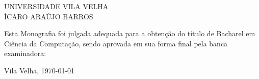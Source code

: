 
%
% 
%
\begin{folhadeaprovacao}


\begin{center}


            {UNIVERSIDADE VILA VELHA} \\
           

    \vspace{1.5cm}
                                    {ÍCARO ARAÚJO BARROS}\\
    \bfseries{}
\end{center}

Esta Monografia foi julgada adequada para a obten\c{c}\~{a}o do título  de Bacharel em Ciência da Computação, sendo aprovada em sua forma final  pela banca examinadora:

    \vspace{2.5cm}
    \vfill

    \begin{center}
        Vila Velha, \today{}
    \end{center}
  
\end{folhadeaprovacao}